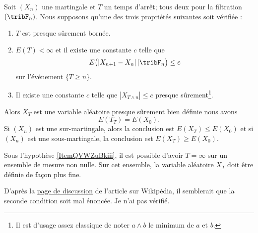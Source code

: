 \begin{theorem} \label{ThoZTrdjtZ}
    Soit \( (X_n)\) une martingale et \( T\) un temps d'arrêt; tous deux pour la filtration \( (\tribF_n)\). Nous supposons qu'une des trois propriétés suivantes soit vérifiée :
    \begin{enumerate}
        \item
            \( T\) est presque sûrement bornée.
        \item
            \( E(T)<\infty\) et il existe une constante \( c\) telle que
            \begin{equation}
                E\big( | X_{n+1}-X_n |\,|\tribF_n \big)\leq c
            \end{equation}
            sur l'événement \( \{ T\geq n \}\).
        \item   \label{ItemQVWZuBkiii}
            Il existe une constante \( c\) telle que \( | X_{T\wedge n} |\leq c\) presque sûrement\footnote{Il est d'usage assez classique de noter \( a\wedge b\) le minimum de \( a\) et \( b\).}.
    \end{enumerate}
    Alors \( X_T\) est une variable aléatoire presque sûrement bien définie nous avons
    \begin{equation}
        E(T_T)=E(X_0).
    \end{equation}
    Si \( (X_n)\) est une sur-martingale, alors la conclusion est \( E(X_T)\leq E(X_0)\) et si \( (X_n)\) est une sous-martingale, la conclusion est \( E(X_T)\geq E(X_0)\).
\end{theorem}

\begin{remark}
    Sous l'hypothèse \ref{ItemQVWZuBkiii}, il est possible d'avoir \( T=\infty\) sur un ensemble de mesure non nulle. Sur cet ensemble, la variable aléatoire \( X_T\) doit être définie de façon plus fine.
\end{remark}

\begin{probleme}
    D'après la \href{https://en.wikipedia.org/wiki/Talk:Optional_stopping_theorem}{page de discussion} de l'article sur Wikipédia, il semblerait que la seconde condition soit mal énoncée. Je n'ai pas vérifié.
\end{probleme}

